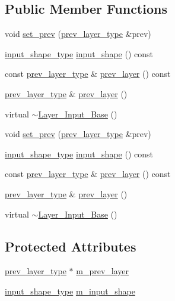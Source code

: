 \subsection*{Public Member Functions}
\begin{DoxyCompactItemize}
\item 
void \hyperlink{classbc_1_1nn_1_1Layer__Input__Base_a9d0dcc3e2d392e131642327942ede518}{set\+\_\+prev} (\hyperlink{structbc_1_1nn_1_1Layer__Output__Base}{prev\+\_\+layer\+\_\+type} \&prev)
\item 
\hyperlink{structbc_1_1Dim}{input\+\_\+shape\+\_\+type} \hyperlink{classbc_1_1nn_1_1Layer__Input__Base_ab7d41ba8f59817a76ceecd13b47f101a}{input\+\_\+shape} () const
\item 
const \hyperlink{structbc_1_1nn_1_1Layer__Output__Base}{prev\+\_\+layer\+\_\+type} \& \hyperlink{classbc_1_1nn_1_1Layer__Input__Base_a30fe05002f852c298572f41da7486670}{prev\+\_\+layer} () const
\item 
\hyperlink{structbc_1_1nn_1_1Layer__Output__Base}{prev\+\_\+layer\+\_\+type} \& \hyperlink{classbc_1_1nn_1_1Layer__Input__Base_aa46a9668548a06e6538f485a0200edbc}{prev\+\_\+layer} ()
\item 
virtual \hyperlink{classbc_1_1nn_1_1Layer__Input__Base_a1737e6fdf4def737d1a616ed69cf7f16}{$\sim$\+Layer\+\_\+\+Input\+\_\+\+Base} ()
\item 
void \hyperlink{classbc_1_1nn_1_1Layer__Input__Base_a9d0dcc3e2d392e131642327942ede518}{set\+\_\+prev} (\hyperlink{structbc_1_1nn_1_1Layer__Output__Base}{prev\+\_\+layer\+\_\+type} \&prev)
\item 
\hyperlink{structbc_1_1Dim}{input\+\_\+shape\+\_\+type} \hyperlink{classbc_1_1nn_1_1Layer__Input__Base_ab7d41ba8f59817a76ceecd13b47f101a}{input\+\_\+shape} () const
\item 
const \hyperlink{structbc_1_1nn_1_1Layer__Output__Base}{prev\+\_\+layer\+\_\+type} \& \hyperlink{classbc_1_1nn_1_1Layer__Input__Base_a30fe05002f852c298572f41da7486670}{prev\+\_\+layer} () const
\item 
\hyperlink{structbc_1_1nn_1_1Layer__Output__Base}{prev\+\_\+layer\+\_\+type} \& \hyperlink{classbc_1_1nn_1_1Layer__Input__Base_aa46a9668548a06e6538f485a0200edbc}{prev\+\_\+layer} ()
\item 
virtual \hyperlink{classbc_1_1nn_1_1Layer__Input__Base_a1737e6fdf4def737d1a616ed69cf7f16}{$\sim$\+Layer\+\_\+\+Input\+\_\+\+Base} ()
\end{DoxyCompactItemize}
\subsection*{Protected Attributes}
\begin{DoxyCompactItemize}
\item 
\hyperlink{structbc_1_1nn_1_1Layer__Output__Base}{prev\+\_\+layer\+\_\+type} $\ast$ \hyperlink{classbc_1_1nn_1_1Layer__Input__Base_a7953ac2f759d65d19f514c74b0b36933}{m\+\_\+prev\+\_\+layer}
\item 
\hyperlink{structbc_1_1Dim}{input\+\_\+shape\+\_\+type} \hyperlink{classbc_1_1nn_1_1Layer__Input__Base_a62e4c2be3ab87af2b1e0a963f058241a}{m\+\_\+input\+\_\+shape}
\end{DoxyCompactItemize}


